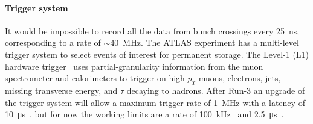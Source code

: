 


\paragraph*{Trigger system} \hfill \break
It would be impossible to record all the data from bunch crossings every \SI{25}{\nano\second}, corresponding to a rate of $\sim$\SI{40}{MHz}. The ATLAS experiment has a multi-level trigger system to select events of interest for permanent storage. The Level-1 (L1) hardware trigger~\cite{atlas_l1_trigger_tdr} uses partial-granularity information from the muon spectrometer and calorimeters to trigger on high $p_T$ muons, electrons, jets, missing transverse energy, and $\tau$ decaying to hadrons. After Run-3 an upgrade of the trigger system will allow a maximum trigger rate of \SI{1}{MHz} with a latency of \SI{10}{\micro\second}~\cite{tdaq_phase2_tdr}, but for now the working limits are a rate of \SI{100}{kHz}~\cite{martinez_run-2_2016} and \SI{2.5}{\micro\second}~\cite{atlas_l1_trigger_tdr}.


